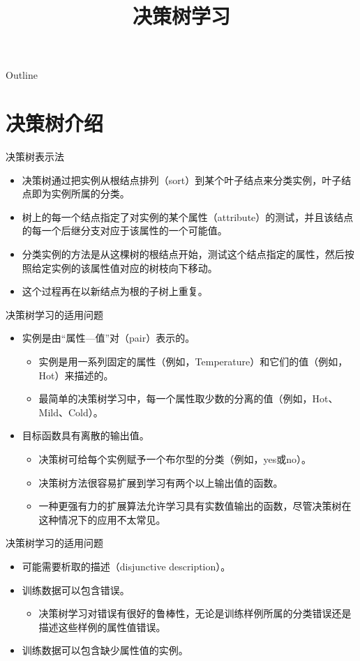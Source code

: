 \documentclass[presentation]{beamer}
\date{}
\title{决策树学习}
\begin{document}
\maketitle
\begin{frame}{Outline}
\tableofcontents
\end{frame}

\section{决策树介绍}
\label{sec:orgaee501b}
\begin{frame}[label={sec:org79e47ab}]{决策树表示法}
\begin{itemize}
\item 决策树通过把实例从根结点排列（sort）到某个叶子结点来分类实例，叶子结点即为实例所属的分类。
\item 树上的每一个结点指定了对实例的某个属性（attribute）的测试，并且该结点的每一个后继分支对应于该属性的一个可能值。
\item 分类实例的方法是从这棵树的根结点开始，测试这个结点指定的属性，然后按照给定实例的该属性值对应的树枝向下移动。
\item 这个过程再在以新结点为根的子树上重复。
\end{itemize}
\end{frame}
\begin{frame}[label={sec:org6b12ecc}]{决策树学习的适用问题}
\begin{itemize}
\item 实例是由“属性---值”对（pair）表示的。
\begin{itemize}
\item 实例是用一系列固定的属性（例如，Temperature）和它们的值（例如，Hot）来描述的。
\item 最简单的决策树学习中，每一个属性取少数的分离的值（例如，Hot、Mild、Cold）。
\end{itemize}
\item 目标函数具有离散的输出值。
\begin{itemize}
\item 决策树可给每个实例赋予一个布尔型的分类（例如，yes或no）。
\item 决策树方法很容易扩展到学习有两个以上输出值的函数。
\item 一种更强有力的扩展算法允许学习具有实数值输出的函数，尽管决策树在这种情况下的应用不太常见。
\end{itemize}
\end{itemize}
\end{frame}
\begin{frame}[label={sec:org73e6128}]{决策树学习的适用问题}
\begin{itemize}
\item 可能需要析取的描述（disjunctive description）。
\item 训练数据可以包含错误。
\begin{itemize}
\item 决策树学习对错误有很好的鲁棒性，无论是训练样例所属的分类错误还是描述这些样例的属性值错误。
\end{itemize}
\item 训练数据可以包含缺少属性值的实例。
\end{itemize}
\end{frame}
\end{document}
